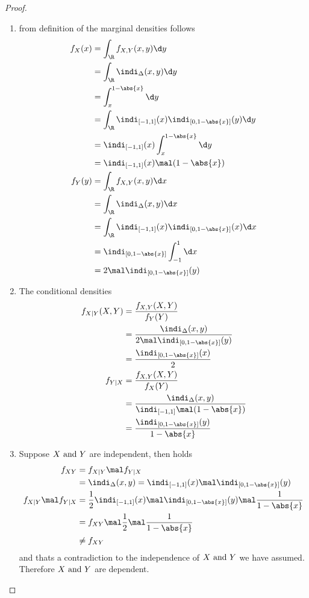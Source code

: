 \subsection{}
\begin{proof}
	\begin{enumerate}
		\item from definition of the marginal densities follows
		\begin{align*}
			f_X(x) &= \int_{\R} f_{X,Y} (x,y)\d y\\
			&= \int_{\R} \indi_{\Delta}(x,y)\d y\\
			&= \int_x^{1-\abs{x}} \d y\\
			&= \int_{\R} \indi_{[-1,1]}(x)\indi_{[0,1-\abs{x}]}(y)\d y\\
			&= \indi_{[-1,1]}(x)\int_x^{1-\abs{x}}\d y\\
			&= \indi_{[-1,1]}(x)\mal (1-\abs{x})\\
			f_Y(y) &= \int_{\R} f_{X,Y}(x,y)\d x\\
			&= \int_{\R} \indi_{\Delta}(x,y)\d x\\
			&= \int_{\R}\indi_{[-1,1]}(x)\indi_{[0,1-\abs{x}]}(x)\d x\\
			&= \indi_{[0,1-\abs{x}]} \int_{-1}^1\d x\\
			&= 2\mal \indi_{[0,1-\abs{x}]}(y)
		\end{align*}
		\item The conditional densities
		\begin{align*}
			f_{X\mid Y}(X,Y) &= \frac{f_{X,Y}(X,Y)}{f_Y(Y)}\\
			&= \frac{\indi_{\Delta}(x,y)}{2\mal \indi_{[0,1-\abs{x}]}(y)}\\
			&= \frac{\indi_{[0,1-\abs{x}]}(x)}{2}\\
			f_{Y\mid X} &= \frac{f_{X,Y}(X,Y)}{f_X(Y)}\\
			&= \frac{\indi_{\Delta}(x,y)}{\indi_{[-1,1]}\mal (1-\abs{x})}\\
			&= \frac{\indi_{[0,1-\abs{x}]}(y)}{1-\abs{x}}\\
		\end{align*}
		\item Suppose $X \text{ and } Y$ are independent, then holds
		\begin{align*}
			f_{XY} &= f_{X\mid Y} \mal f_{Y\mid X}\\
			&= \indi_{\Delta}(x,y) = \indi_{[-1,1]}(x) \mal \indi_{[0,1-\abs{x}]}(y)\\
			f_{X\mid Y} \mal f_{Y\mid X} &=\frac{1}{2} \indi_{[-1,1]}(x) \mal \indi_{[0,1-\abs{x}]}(y) \mal \frac{1}{1-\abs{x}}\\
			&= f_{XY} \mal \frac{1}{2}\mal \frac{1}{1-\abs{x}}\\
			&\neq f_{XY} 
		\end{align*}
		and thats a contradiction to the independence of $X \text{ and } Y$ we have assumed. Therefore $X \text{ and } Y$ are dependent.
	\end{enumerate}
\end{proof}

